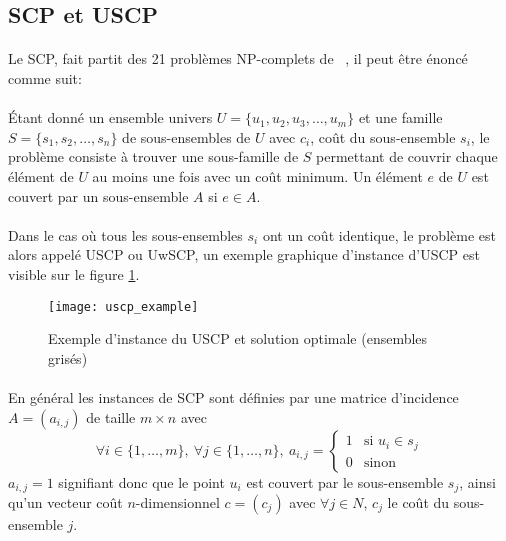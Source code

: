 \documentclass[a4paper,11pt,twoside,french,report]{../common/simplem}
\begin{document}
			\subsection{\acrshort{SCP} et \acrshort{USCP}}
				\paragraph*{}
					Le \gls{SCP}, fait partit des 21 problèmes NP-complets de \citeauthor{Karp1972}~\cite{Karp1972}, il peut être énoncé comme suit:
				\paragraph*{}
					Étant donné un ensemble univers \(U = \{u_1, u_2, u_3, \dots, u_m\}\) et une famille \(S = \{s_1, s_2, \dots, s_n\}\) de sous-ensembles de \(U\) avec \(c_i\), coût du sous-ensemble \(s_i\), le problème consiste à trouver une sous-famille de \(S\) permettant de couvrir chaque élément de \(U\) au moins une fois avec un coût minimum. Un élément \(e\) de \(U\) est couvert par un sous-ensemble \(A\) si \(e \in A\).
				\paragraph*{}
					Dans le cas où tous les sous-ensembles \(s_i\) ont un coût identique, le problème est alors appelé \gls{USCP} ou \gls{UwSCP}, un exemple graphique d'instance d'\gls{USCP} est visible sur le figure \ref{fig:uscp_example}.
				\begin{figure}[H]
					\centering%
					\texttt{[image: uscp\_example]}%
					\caption{Exemple d'instance du \acrshort{USCP} et solution optimale (ensembles grisés)~\cite{Mount2017}}%
					\label{fig:uscp_example}%
				\end{figure}
				\paragraph*{}
					En général les instances de \gls{SCP} sont définies par une matrice d'incidence \(A = \left(a_{i,j}\right)\) de taille \(m \times n\) avec
					\[\forall i \in \{1,\ldots,m\},\ \forall j \in \{1,\ldots,n\},\ a_{i,j} = \left\{
						\begin{array}{ll}
							1 & \text{si } u_i \in s_j \\
							0 & \text{sinon}
						\end{array}
					\right.\]
					\(a_{i,j} = 1\) signifiant donc que le point \(u_i\) est couvert par le sous-ensemble \(s_j\), ainsi qu'un vecteur coût \(n\)-dimensionnel \(c = \left(c_j\right)\) avec \(\forall j \in N\), \(c_j\) le coût du sous-ensemble \(j\).
\end{document}
